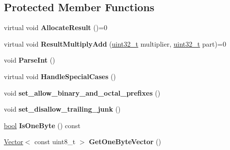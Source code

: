 \subsection*{Protected Member Functions}
\begin{DoxyCompactItemize}
\item 
\mbox{\label{classv8_1_1internal_1_1StringToIntHelper_a408d36113d7981141269d8da4908ffb5}} 
virtual void {\bfseries Allocate\+Result} ()=0
\item 
\mbox{\label{classv8_1_1internal_1_1StringToIntHelper_a7e1f0a44fd15e60ed769f00e3b027e00}} 
virtual void {\bfseries Result\+Multiply\+Add} (\mbox{\hyperlink{classuint32__t}{uint32\+\_\+t}} multiplier, \mbox{\hyperlink{classuint32__t}{uint32\+\_\+t}} part)=0
\item 
\mbox{\label{classv8_1_1internal_1_1StringToIntHelper_a9171f9c77ba52a880880fb98d649fae4}} 
void {\bfseries Parse\+Int} ()
\item 
\mbox{\label{classv8_1_1internal_1_1StringToIntHelper_a9741312c11082d4ad32127dbbea79dbe}} 
virtual void {\bfseries Handle\+Special\+Cases} ()
\item 
\mbox{\label{classv8_1_1internal_1_1StringToIntHelper_a4cb078738556c1b6a446fcf30bcd82f4}} 
void {\bfseries set\+\_\+allow\+\_\+binary\+\_\+and\+\_\+octal\+\_\+prefixes} ()
\item 
\mbox{\label{classv8_1_1internal_1_1StringToIntHelper_ae5a761be631876e388d061f56c284dd9}} 
void {\bfseries set\+\_\+disallow\+\_\+trailing\+\_\+junk} ()
\item 
\mbox{\label{classv8_1_1internal_1_1StringToIntHelper_a47007b5ad84fe60833b0c616c82967ea}} 
\mbox{\hyperlink{classbool}{bool}} {\bfseries Is\+One\+Byte} () const
\item 
\mbox{\label{classv8_1_1internal_1_1StringToIntHelper_a6b9af09388edece46bfa1925d876794d}} 
\mbox{\hyperlink{classv8_1_1internal_1_1Vector}{Vector}}$<$ const uint8\+\_\+t $>$ {\bfseries Get\+One\+Byte\+Vector} ()

\end{DoxyCompactItemize}
